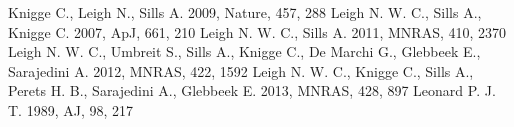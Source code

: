 \documentclass{aastex62}
\begin{document}
\begin{thebibliography}{}
 Knigge C., Leigh
  N., Sills A. 2009, Nature, 457, 288
 Leigh
  N. W. C., Sills A., Knigge C. 2007, ApJ, 661, 210
 Leigh N. W. C., Sills A. 2011, MNRAS, 410, 2370
 Leigh N. W. C., Umbreit S.,
Sills A., Knigge C., De Marchi G., Glebbeek E., Sarajedini A. 2012, MNRAS, 422, 1592
 Leigh N. W. C., Knigge C.,
Sills A., Perets H. B., Sarajedini A., Glebbeek E. 2013, MNRAS, 428, 897
 Leonard
  P. J. T. 1989, AJ, 98, 217

\end{thebibliography}
\end{document}
